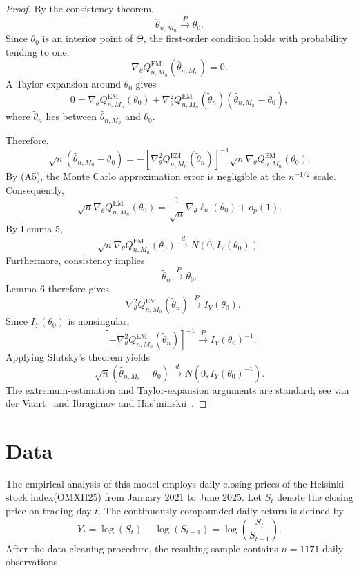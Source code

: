 \documentclass[a4paper,11pt]{amsart}
\theoremstyle{definition}
\theoremstyle{plain}
\theoremstyle{remark}
\newcommand{\1}{\mathbf{1}}
\begin{document}
\begin{proof}
By the consistency theorem,
$$
\widehat\theta_{n,M_n}
\xrightarrow{P}
\theta_0.
$$
Since $\theta_0$ is an interior point of $\Theta$, the first-order condition holds with probability tending to one:
$$
\nabla_\theta
Q_{n,M_n}^{\mathrm{EM}}
(\widehat\theta_{n,M_n})
=
0.
$$
A Taylor expansion around $\theta_0$ gives
$$
0 =\nabla_\theta
Q_{n,M_n}^{\mathrm{EM}}(\theta_0)
+
\nabla_\theta^2
Q_{n,M_n}^{\mathrm{EM}}(\widetilde\theta_n)
\left(
\widehat\theta_{n,M_n}-\theta_0
\right),
$$
where $\widetilde\theta_n$ lies between
$\widehat\theta_{n,M_n}$ and $\theta_0$.

Therefore,
$$
\sqrt n
\left(
\widehat\theta_{n,M_n}-\theta_0
\right)
=
-
\left[
\nabla_\theta^2
Q_{n,M_n}^{\mathrm{EM}}
(\widetilde\theta_n)
\right]^{-1}
\sqrt n
\nabla_\theta
Q_{n,M_n}^{\mathrm{EM}}(\theta_0).
$$
By (A5), the Monte Carlo approximation error is negligible at the $n^{-1/2}$ scale. Consequently,
$$
\sqrt n
\nabla_\theta
Q_{n,M_n}^{\mathrm{EM}}(\theta_0)
=
\frac1{\sqrt n}
\nabla_\theta\ell_n(\theta_0)
+
o_p(1).
$$
By Lemma 5,
$$
\sqrt n
\nabla_\theta
Q_{n,M_n}^{\mathrm{EM}}(\theta_0)
\xrightarrow{d}
N\left(
0,I_Y(\theta_0)
\right).
$$
Furthermore, consistency implies
$$
\widetilde\theta_n
\xrightarrow{P}
\theta_0.
$$
Lemma 6 therefore gives
$$
-\nabla_\theta^2 Q_{n,M_n}^{\mathrm{EM}}
(\widetilde\theta_n)\xrightarrow{P}I_Y(\theta_0).
$$
Since $I_Y(\theta_0)$ is nonsingular,
$$
\left[-\nabla_\theta^2Q_{n,M_n}^{\mathrm{EM}}
(\widetilde\theta_n)\right]^{-1}\xrightarrow{P}
I_Y(\theta_0)^{-1}.
$$
Applying Slutsky's theorem yields
$$
\sqrt n\left(\widehat\theta_{n,M_n}-\theta_0 \right)\xrightarrow{d}
N\left(0,I_Y(\theta_0)^{-1}\right).
$$
The extremum-estimation and Taylor-expansion arguments are standard; see van der Vaart~\cite{VanDerVaart2000} and Ibragimov and Has'minskii~\cite{IbragimovHasminskii2013}.
\end{proof}


\section{Data}

The empirical analysis of this model employs daily closing prices of the Helsinki stock index(OMXH25) from January 2021 to June 2025. Let $S_t$ denote the closing price on trading day $t$. The continuously compounded daily return is defined by
\begin{equation}
Y_t=\log(S_t)-\log(S_{t-1})
=\log\left(\frac{S_t}{S_{t-1}}\right).
\end{equation}
After the data cleaning procedure, the resulting sample contains
$n=1171$ daily observations.
\end{document}
